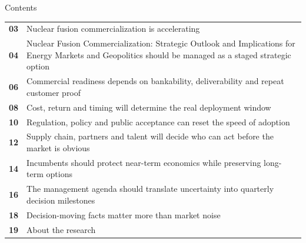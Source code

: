 \documentclass[10pt,a4paper]{article}
\begin{document}
\clearpage
{\sffamily\fontsize{26}{31}\selectfont\color{BONavy} Contents}\par\vspace{10pt}
\begin{tabularx}{\linewidth}{p{14mm}Y}
\textcolor{BOGreen}{\bfseries 03} & Nuclear fusion commercialization is accelerating \\[5pt]
\textcolor{BOGreen}{\bfseries 04} & Nuclear Fusion Commercialization: Strategic Outlook and Implications for Energy Markets and Geopolitics should be managed as a staged strategic option \\[5pt]
\textcolor{BOGreen}{\bfseries 06} & Commercial readiness depends on bankability, deliverability and repeat customer proof \\[5pt]
\textcolor{BOGreen}{\bfseries 08} & Cost, return and timing will determine the real deployment window \\[5pt]
\textcolor{BOGreen}{\bfseries 10} & Regulation, policy and public acceptance can reset the speed of adoption \\[5pt]
\textcolor{BOGreen}{\bfseries 12} & Supply chain, partners and talent will decide who can act before the market is obvious \\[5pt]
\textcolor{BOGreen}{\bfseries 14} & Incumbents should protect near-term economics while preserving long-term options \\[5pt]
\textcolor{BOGreen}{\bfseries 16} & The management agenda should translate uncertainty into quarterly decision milestones \\[5pt]
\textcolor{BOGreen}{\bfseries 18} & Decision-moving facts matter more than market noise \\[5pt]
\textcolor{BOGreen}{\bfseries 19} & About the research \\[5pt]
\end{tabularx}
\clearpage
\end{document}
